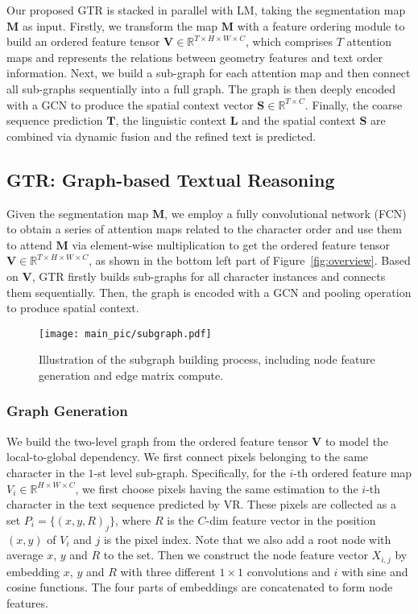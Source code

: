 \documentclass[letterpaper]{article} \usepackage{aaai22}  \usepackage{times}  \usepackage{helvet}  \usepackage{courier}  \usepackage[hyphens]{url}  \usepackage{graphicx} \urlstyle{rm} \def\UrlFont{\rm}  \usepackage{natbib}  \usepackage{caption} \DeclareCaptionStyle{ruled}{labelfont=normalfont,labelsep=colon,strut=off} \frenchspacing  \setlength{\pdfpagewidth}{8.5in}  \setlength{\pdfpageheight}{11in}
\begin{document}
Our proposed GTR is stacked in parallel with LM, taking the segmentation map $\mathbf{M}$ as input. Firstly, we transform the map $\mathbf{M}$ with a feature ordering module to build an ordered feature tensor $\mathbf{V} \in \mathbb{R}^{T\times H\times W\times C}$, which comprises $T$ attention maps and represents the relations between geometry features and text order information. Next, we build a sub-graph for each attention map and then connect all sub-graphs sequentially into a full graph. The graph is then deeply encoded with a GCN to produce the spatial context vector $\mathbf{S} \in \mathbb{R}^{T\times C}$. Finally, the coarse sequence prediction $\mathbf{T}$, the linguistic context $\mathbf{L}$ and the spatial context $\mathbf{S}$ are combined via dynamic fusion and the refined text is predicted.



\subsection{GTR: Graph-based Textual Reasoning}
\label{subsec:gtr}
Given the segmentation map $\mathbf{M}$, we employ a fully convolutional network (FCN) to obtain a series of attention maps related to the character order and use them to attend $\mathbf{M}$ via element-wise multiplication to get the ordered feature tensor $\mathbf{V} \in \mathbb{R}^{T\times H\times W\times C}$, as shown in the bottom left part of Figure~\ref{fig:overview}. Based on $\mathbf{V}$, GTR firstly builds sub-graphs for all character instances and connects them sequentially. Then, the graph is encoded with a GCN and pooling operation to produce spatial context.

\begin{figure}[t]
	\centering
	\texttt{[image: main\_pic/subgraph.pdf]}
    \caption{Illustration of the subgraph building process, including node feature generation and edge matrix compute.}
	\label{fig:graph}
\end{figure}



\subsubsection{Graph Generation}

We build the two-level graph from the ordered feature tensor $\mathbf{V}$ to model the local-to-global dependency. We first connect pixels belonging to the same character in the $1$-st level sub-graph. Specifically, for the $i$-th ordered feature map $V_i \in \mathbb{R}^{H\times W\times C}$, we first choose pixels having the same estimation to the $i$-th character in the text sequence predicted by VR. These pixels are collected as a set $P_i = \{(x,y,R)_j\}$, where $R$ is the $C$-dim feature vector in the position $(x, y)$ of $V_i$ and $j$ is the pixel index. Note that we also add a root node with average $x$, $y$ and $R$ to the set. Then we construct the node feature vector $X_{i,j}$ by embedding $x$, $y$ and $R$ with three different $1\times 1$ convolutions and $i$ with sine and cosine functions. The four parts of embeddings are concatenated to form node features.
\end{document}
